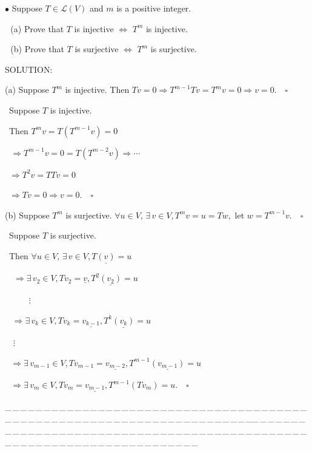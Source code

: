 \documentclass[a4paper, 11pt, UTF8]{article}
\def\Lm{\mathcal{L}}
\begin{document}
\begin{large}
{\small $\bullet$} {\timessl\Large 
Suppose $T\in\Lm(V)$ and $m$ is a positive integer.}\par\,\,
(a) {\timessl\Large Prove that $T$ is injective $\Longleftrightarrow$ $T^m$ is injective.}\par\,\,
(b) {\timessl\Large Prove that $T$ is surjective $\Longleftrightarrow$ $T^m$ is surjective.}\par
{\timesbf S\footnotesize{OLUTION:}}\par\quad
(a) Suppose $T^m$ is injective. Then $Tv=0\Rightarrow T^{m-1} Tv=T^m v=0\Rightarrow v=0.\quad\square$\par\qquad\,
Suppose $T$ is injective.\par\qquad\,
Then $T^m v=T(T^{m-1}v)=0$\par\qquad\qquad\qquad\,\quad\,
$\Rightarrow T^{m-1}v=0=T(T^{m-2}v)\Rightarrow\cdots$\par\qquad\quad\,
$\Rightarrow T^2v=TTv=0$\par\qquad\quad\,
$\Rightarrow Tv=0\Rightarrow v=0.\quad\square$\par\quad
(b) Suppose $T^m$ is surjective. $\forall u\in V,\,\exists\,v\in V,T^m v=u=Tw,$ let $w=T^{m-1}v.\quad\square$\par\qquad\,
Suppose $T$ is surjective.\par\qquad\,
Then $\forall u\in V,\,\exists\,v\in V, T\underline{(v)}=u$\par\qquad\qquad\,\,\,\,
$\Rightarrow\exists\,v_2\in V,Tv_2=\underline{v}, T^2\underline{(v_2)}=u$
\par\qquad\qquad\qquad\qquad\qquad\qquad\quad\,
$\qquad\,\,\vdots$\par\qquad\qquad\qquad\,\,\,
$\Rightarrow\exists\,v_k\in V,Tv_k=\underline{v_{k-1}}, T^{k}\underline{(v_k)}=u$\par\quad\qquad\qquad\qquad\qquad\qquad\qquad\qquad\qquad\quad\,\,
$\,\,\vdots$\par\qquad\qquad\qquad\quad\,\,
$\Rightarrow\exists\,v_{m-1}\in V,Tv_{m-1}=\underline{v_{m-2}}, T^{m-1}\underline{(v_{m-1})}=u$\par\qquad\qquad\qquad\qquad\qquad\qquad\qquad\,\,
$\Rightarrow\exists\,v_m\in V,Tv_m=\underline{v_{m-1}}, T^{m-1}(Tv_{m})=u.\quad\square$\par
{\tiny \_\,\_\,\_\,\_\,\_\,\_\,\_\,\_\,\_\,\_\,\_\,\_\,\_\,\_\,\_\,\_\,\_\,\_\,\_\,\_\,\_\,\_\,\_\,\_\,\_\,\_\,\_\,\_\,\_\,\_\,\_\,\_\,\_\,\_\,\_\,\_\,\_\,\_\,\_\,\_\,\_\,\_\,\_\,\_\,\_\,\_\,\_\,\_\,\_\,\_\,\_\,\_\,\_\,\_\,\_\,\_\,\_\,\_\,\_\,\_\,\_\,\_\,\_\,\_\,\_\,\_\,\_\,\_\,\_\,\_\,\_\_\,\_\,\_\,\_\,\_\,\_\,\_\,\_\,\_\,\_\,\_\,\_\,\_\,\_\,\_\,\_\,\_\,\_\,\_\,\_\,\_\,\_\,\_\,\_\,\_\,\_\,\_\,\_\,\_\,\_\,\_\,\_\,\_\,\_\,\_\,\_\,\_\,\_\,\_\,\_\,\_\,\_\,\_\,\_\,\_\,\_\,\_\,\_\,\_\,\_\,\_\,\_\,\_\,\_\,\_\,\_\,\_\,\_\,\_\,\_\,\_\,\_\,\_\,\_\,\_\,\_\,\_\,\_\,\_\,\_\,\_}{\tiny\,\par}


\end{large}
\end{document}
